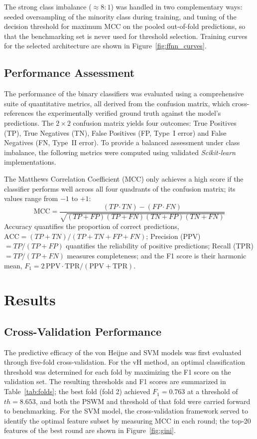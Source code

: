 \documentclass[unnumsec,webpdf,contemporary,large]{oup-authoring-template}
\begin{document}
The strong class imbalance ($\approx 8{:}1$) was handled in two complementary ways: seeded oversampling of the minority class during training, and tuning of the decision threshold for maximum MCC on the pooled out-of-fold predictions, so that the benchmarking set is never used for threshold selection. Training curves for the selected architecture are shown in Figure~\ref{fig:ffnn_curves}.

\subsection{Performance Assessment}

The performance of the binary classifiers was evaluated using a comprehensive suite of quantitative metrics, all derived from the confusion matrix, which cross-references the experimentally verified ground truth against the model's predictions. The $2\times 2$ confusion matrix yields four outcomes: True Positives (TP), True Negatives (TN), False Positives (FP, Type~I error) and False Negatives (FN, Type~II error). To provide a balanced assessment under class imbalance, the following metrics were computed using validated \textit{Scikit-learn} implementations.

The Matthews Correlation Coefficient (MCC) only achieves a high score if the classifier performs well across all four quadrants of the confusion matrix; its values range from $-1$ to $+1$:
\begin{equation}
\mathrm{MCC} = \frac{(TP\cdot TN)-(FP\cdot FN)}{\sqrt{(TP+FP)(TP+FN)(TN+FP)(TN+FN)}}
\end{equation}
Accuracy quantifies the proportion of correct predictions, $\mathrm{ACC}=(TP+TN)/(TP+TN+FP+FN)$; Precision (PPV) $=TP/(TP+FP)$ quantifies the reliability of positive predictions; Recall (TPR) $=TP/(TP+FN)$ measures completeness; and the F1 score is their harmonic mean, $F_1 = 2\,\mathrm{PPV}\cdot\mathrm{TPR}/(\mathrm{PPV}+\mathrm{TPR})$.


\section{Results}

\subsection{Cross-Validation Performance}

The predictive efficacy of the von Heijne and SVM models was first evaluated through five-fold cross-validation. For the vH method, an optimal classification threshold was determined for each fold by maximizing the F1 score on the validation set. The resulting thresholds and F1 scores are summarized in Table~\ref{tab:folds}; the best fold (fold 2) achieved $F_1 = 0.763$ at a threshold of $\mathit{th} = 8.653$, and both the PSWM and threshold of that fold were carried forward to benchmarking. For the SVM model, the cross-validation framework served to identify the optimal feature subset by measuring MCC in each round; the top-20 features of the best round are shown in Figure~\ref{fig:gini}.
\end{document}
